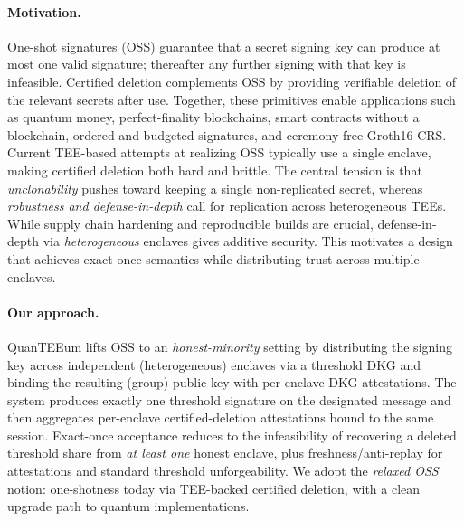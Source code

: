 \documentclass[runningheads,orivec]{llncs}
\newcommand{\prot}{\textsf{QuanTEEum}}
\begin{document}
\paragraph{Motivation.}
One-shot signatures (OSS) guarantee that a secret signing key can produce at most one valid signature; thereafter any further signing with that key is infeasible. Certified deletion complements OSS by providing verifiable deletion of the relevant secrets after use. Together, these primitives enable applications such as quantum money, perfect-finality blockchains, smart contracts without a blockchain, ordered and budgeted signatures, and ceremony-free Groth16 CRS. 
Current TEE-based attempts at realizing OSS typically use a single enclave, making certified deletion both hard and brittle. The central tension is that \emph{unclonability} pushes toward keeping a single non-replicated secret, whereas \emph{robustness and defense-in-depth} call for replication across heterogeneous TEEs. While supply chain hardening and reproducible builds are crucial, defense-in-depth via \emph{heterogeneous} enclaves gives additive security.
This motivates a design that achieves exact-once semantics while distributing trust across multiple enclaves.

\paragraph{Our approach.}
\prot{} lifts OSS to an \emph{honest-minority} setting by distributing the signing key across independent (heterogeneous) enclaves via a threshold DKG and binding the resulting (group) public key with per-enclave DKG attestations. The system produces exactly one threshold signature on the designated message and then aggregates per-enclave certified-deletion attestations bound to the same session. 
Exact-once acceptance reduces to the infeasibility of recovering a deleted threshold share from \emph{at least one} honest enclave, plus freshness/anti-replay for attestations and standard threshold unforgeability. We adopt the \emph{relaxed OSS} notion: one-shotness today via TEE-backed certified deletion, with a clean upgrade path to quantum implementations.
\end{document}
